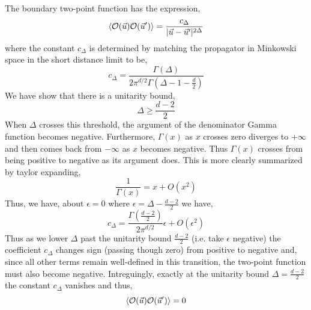 \documentclass[12pt]{article}
\begin{document}
The boundary two-point function has the expression,
\[ \left< \mathcal{O}(\vec{u}) \mathcal{O}(\vec{u}') \right> = \frac{c_\Delta}{|\vec{u} - \vec{u}'|^{2 \Delta}} \]
where the constant $c_{\Delta}$ is determined by matching the propagator in Minkowski space in the short distance limit to be,
\[ c_\Delta = \frac{\Gamma(\Delta)}{2 \pi^{d / 2} \Gamma(\Delta - 1 - \tfrac{d}{2})} \]
We have show that there is a unitarity bound,
\[ \Delta \ge \frac{d - 2}{2} \]
When $\Delta$ crosses this threshold, the argument of the denominator Gamma function becomes negative. Furthermore, $\Gamma(x)$ as $x$ crosses zero diverges to $+ \infty$ and then comes back from $-\infty$ as $x$ becomes negative. Thus $\Gamma(x)$ crosses from being positive to negative as its argument does. This is more clearly summarized by taylor expanding,
\[ \frac{1}{\Gamma(x)} = x + O(x^2) \]
Thus, we have, about $\epsilon = 0$ where $\epsilon = \Delta - \frac{d-2}{2}$ we have,
\[ c_\Delta = \frac{\Gamma\left( \tfrac{d-2}{2} \right)}{2 \pi^{d/2}} \epsilon + O(\epsilon^2) \]
Thus as we lower $\Delta$ past the unitarity bound $\frac{d-2}{2}$ (i.e. take $\epsilon$ negative) the coefficient $c_\Delta$ changes sign (passing though zero) from positive to negative and, since all other terms remain well-defined in this transition, the two-point function must also become negative. Intreguingly, exactly at the unitarity bound $\Delta = \frac{d-2}{2}$ the constant $c_{\Delta}$ vanishes and thus,
\[ \left< \mathcal{O}(\vec{u}) \mathcal{O}(\vec{u}') \right> = 0 \]

\subsection{}
\end{document}
